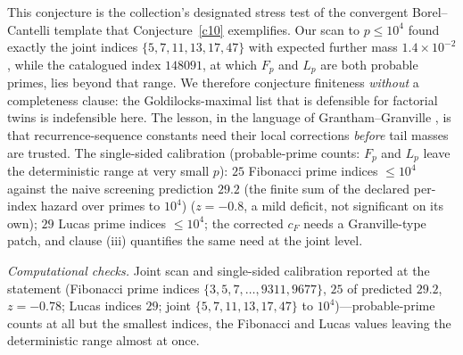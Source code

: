 \documentclass[11pt]{article}
\theoremstyle{definition}
\begin{document}
This conjecture is the collection's designated stress test of the convergent
Borel--Cantelli template that Conjecture~\ref{c10} exemplifies.  Our
scan to $p\le10^4$ found exactly the joint indices
$\{5,7,11,13,17,47\}$ with expected further mass $1.4\times10^{-2}$,
while the catalogued index $148091$, at which $F_p$ and $L_p$ are
both probable primes, lies beyond that range.  We therefore
conjecture finiteness \emph{without} a completeness clause: the
Goldilocks-maximal list that is defensible for factorial twins is
indefensible here.  The lesson, in the language of
Grantham--Granville
\cite{GranthamGranville}, is that recurrence-sequence constants need
their local corrections \emph{before} tail masses are trusted.  The
single-sided calibration (probable-prime counts: $F_p$ and $L_p$
leave the deterministic range at very small $p$): $25$ Fibonacci
prime indices
$\le10^4$ against the naive screening prediction $29.2$ (the finite sum of the declared per-index hazard over primes to $10^4$)
($z=-0.8$, a mild deficit, not significant on its own); $29$ Lucas
prime indices $\le10^4$; the corrected $c_F$ needs a Granville-type patch,
and clause (iii) quantifies the same need at the joint level.

\emph{Computational checks.}  Joint scan and single-sided calibration reported at the
statement (Fibonacci prime indices $\{3,5,7,\dots,9311,9677\}$, $25$
of predicted $29.2$, $z=-0.78$; Lucas indices $29$; joint
$\{5,7,11,13,17,47\}$ to $10^4$)---probable-prime counts at all but
the smallest indices, the Fibonacci and Lucas values leaving the
deterministic range almost at once.
\end{document}
